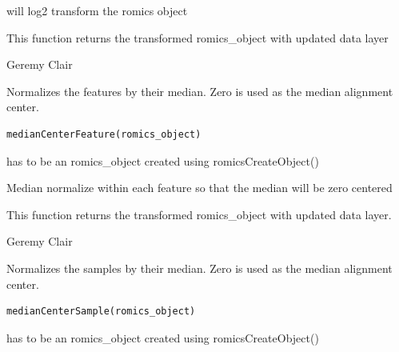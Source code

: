 \documentclass[a4paper]{book}
\begin{document}
%
\begin{Details}
will log2 transform the romics object
\end{Details}
%
\begin{Value}
This function returns the transformed romics\_object with updated data layer
\end{Value}
%
\begin{Author}
Geremy Clair
\end{Author}
%
\begin{Description}
Normalizes the features by their median. Zero is used as the median alignment center.
\end{Description}
%
\begin{Usage}
\begin{verbatim}
medianCenterFeature(romics_object)
\end{verbatim}
\end{Usage}
%
\begin{Arguments}
\begin{ldescription}
\item[\code{romics\_object}] has to be an romics\_object created using romicsCreateObject()
\end{ldescription}
\end{Arguments}
%
\begin{Details}
Median normalize within each feature so that the median will be zero centered
\end{Details}
%
\begin{Value}
This function returns the transformed romics\_object with updated data layer.
\end{Value}
%
\begin{Author}
Geremy Clair
\end{Author}
%
\begin{Description}
Normalizes the samples by their median. Zero is used as the median alignment center.
\end{Description}
%
\begin{Usage}
\begin{verbatim}
medianCenterSample(romics_object)
\end{verbatim}
\end{Usage}
%
\begin{Arguments}
\begin{ldescription}
\item[\code{romics\_object}] has to be an romics\_object created using romicsCreateObject()
\end{ldescription}
\end{Arguments}
\end{document}
